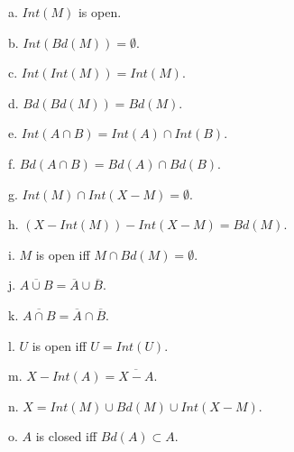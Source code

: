 \documentclass[12pt, std]{article}
\begin{document}
\qquad a.  $Int(M)$ is open.

\qquad b.  $Int(Bd(M)) = \emptyset$.

\qquad c.  $Int(Int(M)) = Int(M)$.

\qquad d.  $Bd(Bd(M)) = Bd(M)$.

\qquad e.  $Int(A \cap B) = Int(A) \cap Int (B)$.

\qquad f.  $Bd(A \cap B) = Bd(A) \cap Bd(B)$.

\qquad g.  $Int(M) \cap Int(X-M) = \emptyset$.

\qquad h.  $(X - Int(M)) - Int(X-M) = Bd(M)$.

\qquad i.  $M$ is open iff $M \cap Bd(M) = \emptyset$.

\qquad j. $\overline{A \cup B} = \overline{A} \cup \overline{B}$.

\qquad k. $\overline{A \cap B} = \overline{A} \cap \overline{B}$.

\qquad l. $U$ is open iff $U = Int(U)$.

\qquad m. $X- Int(A) = \overline{X-A}$.

\qquad n. $X= Int(M) \cup Bd(M) \cup Int (X-M)$.

\qquad o. $A$ is closed iff $Bd(A) \subset A$.
\end{document}
